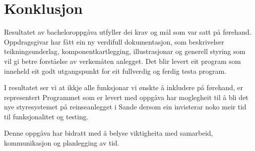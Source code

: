 \chapter{Konklusjon}
\thispagestyle{fancy}

Resultatet av bacheloroppgåva utfyller dei krav og mål som var satt på førehand.
Oppdragsgivar har fått ein ny verdifull dokumentasjon, som beskrivelser teikningsunderlag, komponentkartlegging,
illustrasjonar og generell styring som vil gi betre forståelse av verkemåten anlegget.
Det blir levert eit program som inneheld eit godt utgangspunkt for eit fullverdig og ferdig testa program.

I resultatet ser vi at ikkje alle funksjonar vi ønskte å inkludere på førehand, er representert
Programmet som er levert med oppgåva har moglegheit til å bli det nye styresystemet på reinseanlegget i Sande
dersom ein invisterar noko meir tid til funksjonalitet og testing.

Denne oppgåva har bidratt med å belyse viktigheita med samarbeid, kommunikasjon og planlegging av tid.


